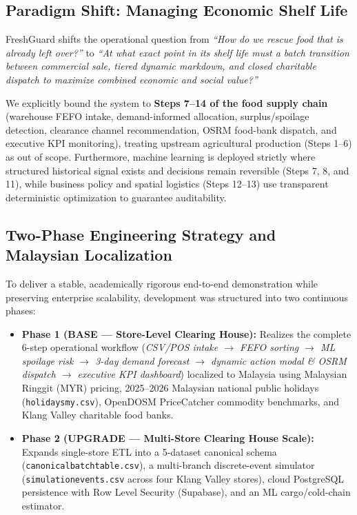 \documentclass[11pt,a4paper]{article}
\renewcommand{\_}{\oldunderscore\allowbreak}
\begin{document}
\subsection{Paradigm Shift: Managing Economic Shelf Life}
FreshGuard shifts the operational question from \emph{``How do we rescue food that is already left over?''} to \emph{``At what exact point in its shelf life must a batch transition between commercial sale, tiered dynamic markdown, and closed charitable dispatch to maximize combined economic and social value?''}

We explicitly bound the system to \textbf{Steps 7--14 of the food supply chain} (warehouse FEFO intake, demand-informed allocation, surplus/spoilage detection, clearance channel recommendation, OSRM food-bank dispatch, and executive KPI monitoring), treating upstream agricultural production (Steps 1--6) as out of scope. Furthermore, machine learning is deployed strictly where structured historical signal exists and decisions remain reversible (Steps 7, 8, and 11), while business policy and spatial logistics (Steps 12--13) use transparent deterministic optimization to guarantee auditability.

\subsection{Two-Phase Engineering Strategy and Malaysian Localization}
To deliver a stable, academically rigorous end-to-end demonstration while preserving enterprise scalability, development was structured into two continuous phases:
\begin{itemize}[leftmargin=18pt, itemsep=2pt]
    \item \textbf{Phase 1 (BASE --- Store-Level Clearing House):} Realizes the complete 6-step operational workflow (\emph{CSV/POS intake $\to$ FEFO sorting $\to$ ML spoilage risk $\to$ 3-day demand forecast $\to$ dynamic action modal \& OSRM dispatch $\to$ executive KPI dashboard}) localized to Malaysia using Malaysian Ringgit (MYR) pricing, 2025--2026 Malaysian national public holidays (\texttt{holidays\_my.csv}), OpenDOSM PriceCatcher commodity benchmarks, and Klang Valley charitable food banks.
    \item \textbf{Phase 2 (UPGRADE --- Multi-Store Clearing House Scale):} Expands single-store ETL into a 5-dataset canonical schema (\texttt{canonical\_batch\_table.csv}), a multi-branch discrete-event simulator (\texttt{simulation\_events.csv} across four Klang Valley stores), cloud PostgreSQL persistence with Row Level Security (Supabase), and an ML cargo/cold-chain estimator.
\end{itemize}
\end{document}
